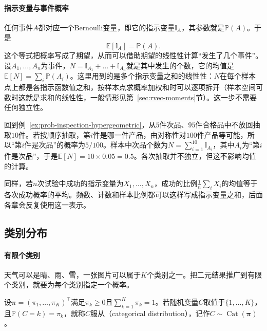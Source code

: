 \paragraph{指示变量与事件概率}
任何事件$A$都对应一个Bernoulli变量，即它的指示变量$\mathbb{I}_A$，其参数就是$\mathbb{P}(A)$。于是
\[
  \mathbb{E}[\mathbb{I}_A]=\mathbb{P}(A).
\]
这个等式把概率写成了期望，从而可以借助期望的线性性计算“发生了几个事件”。设$A_1,\dots,A_n$为事件，$N=\mathbb{I}_{A_1}+\dots+\mathbb{I}_{A_n}$就是其中发生的个数，它的均值是$\mathbb{E}[N]=\sum_i\mathbb{P}(A_i)$。这里用到的是多个指示变量之和的线性性：$N$在每个样本点上都是各指示函数值之和，按样本点求概率加权和时可以逐项拆开（样本空间可数时这就是求和的线性性，一般情形见第~\ref{sec:rvec-moments}节）。这一步不需要任何独立性。

\begin{example}[抽检样本中次品个数的均值]
\label{ex:prob-inspection-mean}
回到例~\ref{ex:prob-inspection-hypergeometric}，从$5$件次品、$95$件合格品中不放回抽取$10$件。若按顺序抽取，第$i$件是哪一件产品，由对称性对$100$件产品等可能，所以“第$i$件是次品”的概率为$5/100$。样本中次品个数为$N=\sum_{i=1}^{10}\mathbb{I}_{A_i}$，其中$A_i$为“第$i$件是次品”，于是$\mathbb{E}[N]=10\times0.05=0.5$。各次抽取并不独立，但这不影响均值的计算。
\end{example}

同样，若$n$次试验中成功的指示变量为$X_1,\dots,X_n$，成功的比例$\frac1n\sum_iX_i$的均值等于各次成功概率的平均。频数、计数和样本比例都可以这样写成指示变量之和，后面各章会反复使用这一表示。

\subsection{类别分布}
\label{sec:prob-categorical}

\paragraph{有限个类别}
天气可以是晴、雨、雪，一张图片可以属于$K$个类别之一。把二元结果推广到有限个类别，就要为每个类别指定一个概率。

\begin{definition}[类别分布]
\label{def:prob-categorical}
设$\bm{\pi}=(\pi_1,\dots,\pi_K)^{\top}$满足$\pi_k\geq0$且$\sum_{k=1}^K\pi_k=1$。若随机变量$C$取值于$\{1,\dots,K\}$，且$\mathbb{P}(C=k)=\pi_k$，就称$C$服从（categorical distribution），记作$C\sim\operatorname{Cat}(\bm{\pi})$。
\end{definition}

